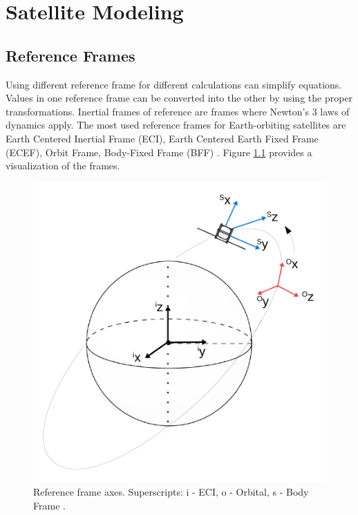 \chapter{Satellite Modeling}

\section{Reference Frames}


Using different reference frame for different calculations can simplify equations. Values in one reference frame can be converted into the other by using the proper transformations.
Inertial frames of reference are frames where Newton's 3 laws of dynamics apply.
The most used reference frames for Earth-orbiting satellites are Earth Centered Inertial Frame (ECI), Earth Centered Earth Fixed Frame (ECEF), Orbit Frame, Body-Fixed Frame (BFF)  \cite{ref1} \cite{ref2}. Figure \ref{fig:frames} provides a visualization of the frames.

\begin{figure}[h!]
	\centering 
	\includegraphics[width=140mm]{figures/frame.pdf}	
	\caption{Reference frame axes. Superscripts: i - ECI, o - Orbital, s - Body Frame \cite{our_report}.}
	\label{fig:frames}
\end{figure}

